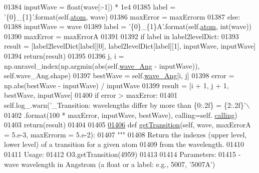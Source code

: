 \begin{DoxyCode}
{{01384             inputWave = float(wave[:-1]) * 1e4
01385             label = \textcolor{stringliteral}{'\{0\}\_\{1\}'}.format(self.\hyperlink{classpyneb_1_1core_1_1pynebcore_1_1_atom_a192f3e20446d7fba81d789bc705d6c71}{atom}, wave)
01386             maxError = maxErrorm
01387         \textcolor{keywordflow}{else}:
01388             inputWave = wave
01389             label = \textcolor{stringliteral}{'\{0\}\_\{1\}A'}.format(self.\hyperlink{classpyneb_1_1core_1_1pynebcore_1_1_atom_a192f3e20446d7fba81d789bc705d6c71}{atom}, int(wave))
01390             maxError = maxErrorA
01391             
01392         \textcolor{keywordflow}{if} label \textcolor{keywordflow}{in} label2levelDict:
01393             result = [label2levelDict[label][0], label2levelDict[label][1], inputWave, inputWave]
01394             return(result)
01395         
01396         j, i = np.unravel\_index(np.argmin(abs(self.\hyperlink{classpyneb_1_1core_1_1pynebcore_1_1_atom_a044e1349bb63766a5f3d25fbf04b5c2c}{wave\_Ang} - inputWave)), self.wave\_Ang.shape)
01397         bestWave = self.\hyperlink{classpyneb_1_1core_1_1pynebcore_1_1_atom_a044e1349bb63766a5f3d25fbf04b5c2c}{wave\_Ang}[i, j]
01398         error = np.abs(bestWave - inputWave) / inputWave
01399         result = [i + 1, j + 1, bestWave, inputWave]
01400         \textcolor{keywordflow}{if} error > maxError:
01401             self.log\_.warn(\textcolor{stringliteral}{'\_Transition: wavelengths differ by more than \{0:.2f\}%
       = \{2:.2f\}'}\(\backslash\)
01402                            .format(100 * maxError, inputWave, bestWave), calling=self.
      \hyperlink{classpyneb_1_1core_1_1pynebcore_1_1_atom_a373b7735acf4f528b54bddf373ad67a1}{calling})
01403         return(result)
01404 
01405 
\hypertarget{pynebcore_8py_source_l01406}{}\hyperlink{classpyneb_1_1core_1_1pynebcore_1_1_atom_a7c9f17a3d9e841267add92377d9d1ede}{01406}     \textcolor{keyword}{def }\hyperlink{classpyneb_1_1core_1_1pynebcore_1_1_atom_a7c9f17a3d9e841267add92377d9d1ede}{getTransition}(self, wave, maxErrorA = 5.e-3, maxErrorm = 5.e-2):
01407         \textcolor{stringliteral}{"""}
01408 \textcolor{stringliteral}{        Return the indexes (upper level, lower level) of a transition for a given atom }
01409 \textcolor{stringliteral}{            from the wavelength.}
01410 \textcolor{stringliteral}{        }
01411 \textcolor{stringliteral}{        Usage:}
01412 \textcolor{stringliteral}{            O3.getTransition(4959)}
01413 \textcolor{stringliteral}{            }
01414 \textcolor{stringliteral}{        Parameters:}
01415 \textcolor{stringliteral}{            - wave      wavelength in Angstrom (a float or a label: e.g., 5007, '5007A') }
}}
\end{DoxyCode}
